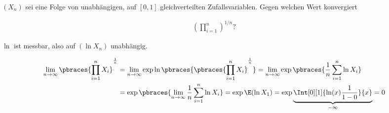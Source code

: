 
\begin{exercise}

$(X_n)$ sei eine Folge von unabhängigen, auf $[0, 1]$ gleichverteilten Zufallsvariablen. Gegen welchen Wert konvergiert

\begin{align*}
  (\prod_{i=1}^n)^{1/n}?
\end{align*}

\end{exercise}


\begin{solution}

$\ln$ ist messbar, also auf $(\ln X_n)$ unabhängig.

\begin{align*}
  \lim_{n \to \infty}
  \pbraces{\prod_{i=1}^n X_i}^\frac{1}{n}
  & =
  \lim_{n \to \infty}
  \exp \ln \pbraces{\pbraces{\prod_{i=1}^n X_i}^\frac{1}{n}}
  =
  \lim_{n \to \infty}
  \exp \pbraces{\frac{1}{n} \sum_{i=1}^n \ln X_i} \\
  & =
  \exp \pbraces
  {\lim_{n \to \infty} \frac{1}{n} \sum_{i=1}^n \ln X_i}
  =
  \exp \E(\ln X_1)
  =
  \exp \underbrace{\Int[0][1]{\ln(x) \frac{1}{1-0}}{x}}_{-\infty} = 0
\end{align*}

\end{solution}

